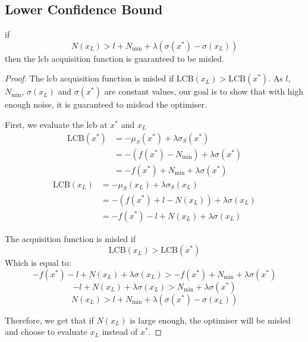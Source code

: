 \subsection{Lower Confidence Bound}
\begin{theorem}
if
\begin{equation*}
    N(x_L) > l + N_{\min} + \lambda (\sigma(x^*) - \sigma(x_L))
\end{equation*}
then the \gls{lcb} acquisition function is guaranteed to be misled.
\end{theorem}

\begin{proof}
The \gls{lcb} acquisition function is misled if $\mathrm{LCB}(x_L) > \mathrm{LCB}(x^*)$. As $l$, $N_{\min}$, $\sigma(x_L)$ and $\sigma(x^*)$ are constant values, our goal is to show that with high enough noise, it is guaranteed to mislead the optimiser.

First, we evaluate the \gls{lcb} at $x^*$ and $x_L$
\begin{equation*}
  \begin{aligned}
    \mathrm{LCB}(x^*) &= - \mu_S(x^*) + \lambda \sigma_S(x^*)
    \\
    &= - (f(x^*) - N_{\min}) + \lambda \sigma(x^*)
    \\
    &= - f(x^*) + N_{\min} + \lambda \sigma(x^*)
  \end{aligned}
\end{equation*}
\begin{equation*}
  \begin{aligned}
    \mathrm{LCB}(x_L) &= - \mu_S(x_L) + \lambda \sigma_S(x_L)
    \\
    &= - (f(x^*) + l - N(x_L)) + \lambda \sigma(x_L)
    \\
    &= - f(x^*) - l + N(x_L) + \lambda \sigma(x_L)
  \end{aligned}
\end{equation*}

The acquisition function is misled if
\begin{equation*}
    \mathrm{LCB}(x_L) > \mathrm{LCB}(x^*)
\end{equation*}
Which is equal to:
\begin{equation*}
    - f(x^*) - l + N(x_L) + \lambda \sigma(x_L) > - f(x^*) + N_{\min} + \lambda \sigma(x^*)
\end{equation*}
\begin{equation*}
    - l + N(x_L) + \lambda \sigma(x_L) > N_{\min} + \lambda \sigma(x^*)
\end{equation*}
\begin{equation*}
    N(x_L) > l + N_{\min} + \lambda (\sigma(x^*) - \sigma(x_L))
\end{equation*}

Therefore, we get that if $N(x_L)$ is large enough, the optimiser will be misled and choose to evaluate $x_L$ instead of $x^*$.
\end{proof}

